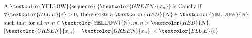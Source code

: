 \documentclass[preview]{standalone}
\begin{document}
\begin{align*}
\begin{aligned}&\text{A \textcolor{YELLOW}{sequence} } \{\textcolor{GREEN}{x_n}\} \text{ is Cauchy if } \\ &\forall \textcolor{BLUE}{\varepsilon} > 0, \text{ there exists a } \textcolor{RED}{N} \in \mathbb{\textcolor{YELLOW}{N}} \\ &\text{such that for all } m, n \in \mathbb{\textcolor{YELLOW}{N}}, m, n > \textcolor{RED}{N}, \\ &|\textcolor{GREEN}{x_m} - \textcolor{GREEN}{x_n}| < \textcolor{BLUE}{\varepsilon}\end{aligned}
\end{align*}
\end{document}

